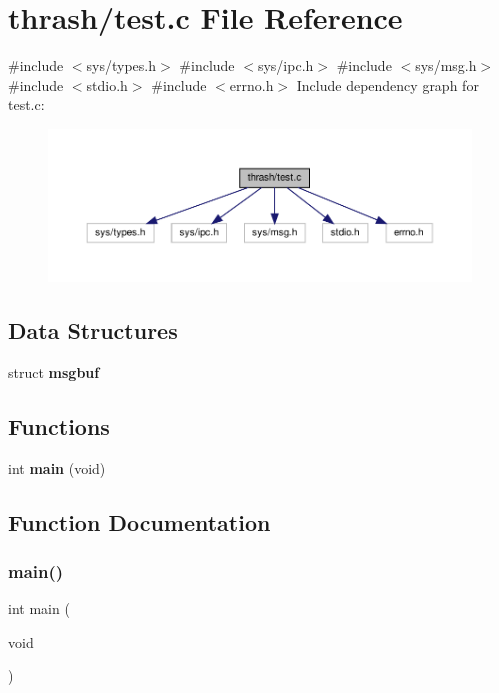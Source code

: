 \section{thrash/test.c File Reference}
\label{test_8c}
{\ttfamily \#include $<$sys/types.\+h$>$}\newline
{\ttfamily \#include $<$sys/ipc.\+h$>$}\newline
{\ttfamily \#include $<$sys/msg.\+h$>$}\newline
{\ttfamily \#include $<$stdio.\+h$>$}\newline
{\ttfamily \#include $<$errno.\+h$>$}\newline
Include dependency graph for test.\+c\+:
\nopagebreak
\begin{figure}[H]
\begin{center}
\leavevmode
\includegraphics[width=350pt]{test_8c__incl}
\end{center}
\end{figure}
\subsection*{Data Structures}
\begin{DoxyCompactItemize}
\item 
struct \textbf{ msgbuf}
\end{DoxyCompactItemize}
\subsection*{Functions}
\begin{DoxyCompactItemize}
\item 
int \textbf{ main} (void)
\end{DoxyCompactItemize}


\subsection{Function Documentation}
\mbox{\label{test_8c_a840291bc02cba5474a4cb46a9b9566fe}} 
\subsubsection{main()}
{\footnotesize\ttfamily int main (\begin{DoxyParamCaption}\item[{void}]{ }\end{DoxyParamCaption})}

